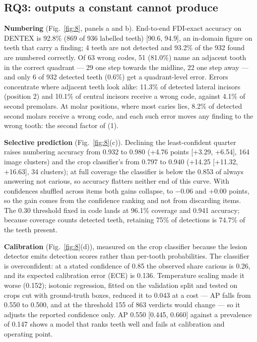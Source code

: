 \documentclass[conference]{IEEEtran}
\begin{document}
\subsection{RQ3: outputs a constant cannot produce}

\textbf{Numbering} (Fig.~\ref{fig:8}, panels a and b). End-to-end FDI-exact accuracy on DENTEX is 92.8\% (869 of 936 labelled teeth) [90.6, 94.9], an in-domain figure on teeth that carry a finding; 4 teeth are not detected and 93.2\% of the 932 found are numbered correctly. Of 63 wrong codes, 51 (81.0\%) name an adjacent tooth in the correct quadrant — 29 one step towards the midline, 22 one step away — and only 6 of 932 detected teeth (0.6\%) get a quadrant-level error. Errors concentrate where adjacent teeth look alike: 11.3\% of detected lateral incisors (position 2) and 10.1\% of central incisors receive a wrong code, against 4.1\% of second premolars. At molar positions, where most caries lies, 8.2\% of detected second molars receive a wrong code, and each such error moves any finding to the wrong tooth: the second factor of (1).

\textbf{Selective prediction} (Fig.~\ref{fig:8}(c)). Declining the least-confident quarter raises numbering accuracy from 0.932 to 0.980 (+4.76 points [+3.29, +6.54], 164 image clusters) and the crop classifier's from 0.797 to 0.940 (+14.25 [+11.32, +16.63], 34 clusters); at full coverage the classifier is below the 0.853 of always answering not carious, so accuracy flatters neither end of this curve. With confidences shuffled across items both gains collapse, to $-$0.06 and +0.00 points, so the gain comes from the confidence ranking and not from discarding items. The 0.30 threshold fixed in code lands at 96.1\% coverage and 0.941 accuracy; because coverage counts detected teeth, retaining 75\% of detections is 74.7\% of the teeth present.

\textbf{Calibration} (Fig.~\ref{fig:8}(d)), measured on the crop classifier because the lesion detector emits detection scores rather than per-tooth probabilities. The classifier is overconfident: at a stated confidence of 0.85 the observed share carious is 0.26, and its expected calibration error (ECE) is 0.136. Temperature scaling made it worse (0.152); isotonic regression, fitted on the validation split and tested on crops cut with ground-truth boxes, reduced it to 0.043 at a cost — AP falls from 0.550 to 0.500, and at the threshold 155 of 863 verdicts would change — so it adjusts the reported confidence only. AP 0.550 [0.445, 0.660] against a prevalence of 0.147 shows a model that ranks teeth well and fails at calibration and operating point.
\end{document}
